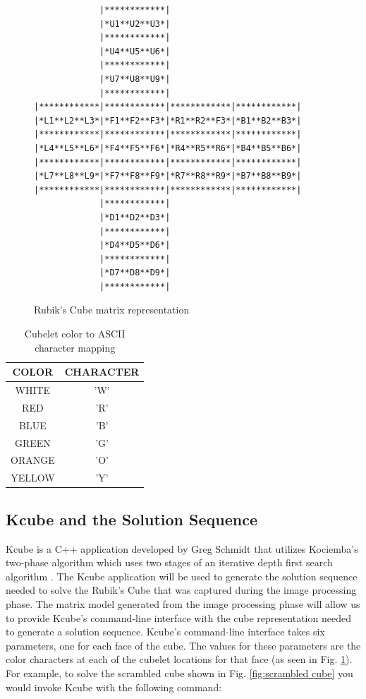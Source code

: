 \documentclass[11pt,english]{article}
\begin{document}
\begin{figure}[!ht]
\centering
\begin{verbatim}
             |************|
             |*U1**U2**U3*|
             |************|
             |*U4**U5**U6*|
             |************|
             |*U7**U8**U9*|
             |************|
|************|************|************|************|
|*L1**L2**L3*|*F1**F2**F3*|*R1**R2**F3*|*B1**B2**B3*|
|************|************|************|************|
|*L4**L5**L6*|*F4**F5**F6*|*R4**R5**R6*|*B4**B5**B6*|
|************|************|************|************|
|*L7**L8**L9*|*F7**F8**F9*|*R7**R8**R9*|*B7**B8**B9*|
|************|************|************|************|
             |************|
             |*D1**D2**D3*|
             |************|
             |*D4**D5**D6*|
             |************|
             |*D7**D8**D9*|
             |************|
\end{verbatim}
\caption{Rubik's Cube matrix representation}
\label{fig:matrix layout}
\end{figure}

\begin{table}[!ht]
\centering
\begin{tabular}{|c|c|}
\hline
\textbf{COLOR} & \textbf{CHARACTER} \\ \hline
WHITE          & 'W'              \\ \hline
RED            & 'R'              \\ \hline
BLUE           & 'B'              \\ \hline
GREEN          & 'G'              \\ \hline
ORANGE         & 'O'              \\ \hline
YELLOW         & 'Y'              \\ \hline
\end{tabular}
\caption{Cubelet color to ASCII character mapping}
\label{table:cubelet representation}
\end{table}

\subsection{Kcube and the Solution Sequence}
\label{sec:Kcube}
Kcube is a C++ application developed by Greg Schmidt that utilizes Kociemba's two-phase algorithm which uses two stages of an iterative depth first search algorithm \cite{The Two-Phase Algorithm}. The Kcube application will be used to generate the solution sequence needed to solve the Rubik's Cube that was captured during the image processing phase. The matrix model generated from the image processing phase will allow us to provide Kcube's command-line interface with the cube representation needed to generate a solution sequence. Kcube's command-line interface takes six parameters, one for each face of the cube. The values for these parameters are the color characters at each of the cubelet locations for that face (as seen in Fig. \ref{fig:matrix layout}). For example, to solve the scrambled cube shown in Fig. \ref{fig:scrambled cube} you would invoke Kcube with the following command:
\end{document}
